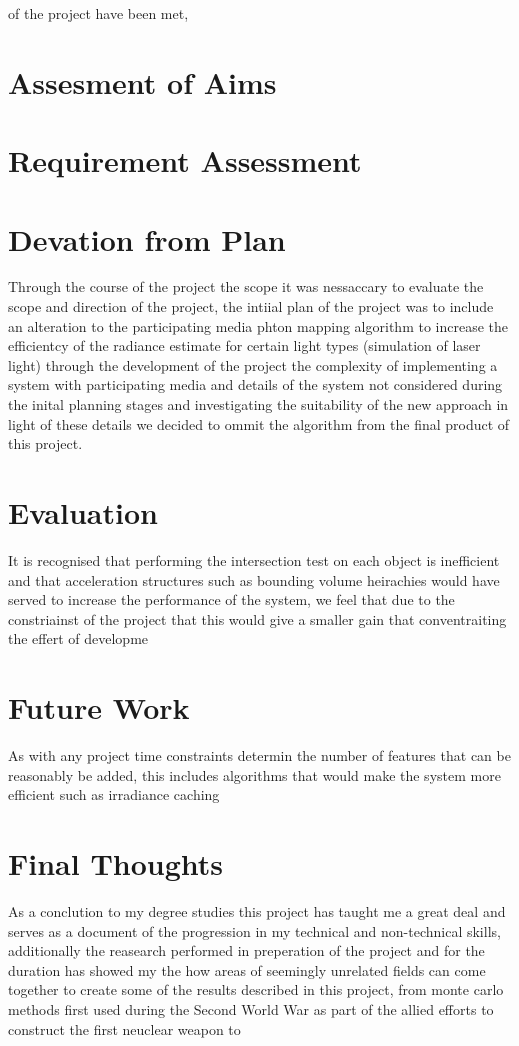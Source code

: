 of the project have been met, 

\section{Assesment of Aims}

\section{Requirement Assessment}

\section{Devation from Plan}
Through the course of the project the scope it was nessaccary to evaluate the scope and direction of the project, the intiial plan
of the project was to include an alteration to the participating media phton mapping algorithm to increase the efficientcy of the
radiance estimate for certain light types (simulation of laser light) through the development of the project the complexity of
implementing a system with participating media and details of the system not considered during the inital planning stages and
investigating the suitability of the new approach in light of these details we decided to ommit the algorithm from the final product
of this project.

\section{Evaluation}
It is recognised that performing the
intersection test on each object is inefficient and that acceleration structures such as bounding volume heirachies would
have served to increase the performance of the system, we feel that due to the constriainst of the project that this
would give a smaller gain that conventraiting the effert of developme

\section{Future Work}
As with any project time constraints determin the number of features that can be reasonably be added, this includes algorithms that
would make the system more efficient such as irradiance caching

\section{Final Thoughts}
As a conclution to my degree studies this project has taught me a great deal and serves as a document of the progression in my technical and
non-technical skills, additionally the reasearch performed in preperation of the project and for the duration has showed my the
how areas of seemingly unrelated fields can come together to create some of the results described in this project, from monte carlo methods
first used during the Second World War as part of the allied efforts to construct the first neuclear weapon to 
